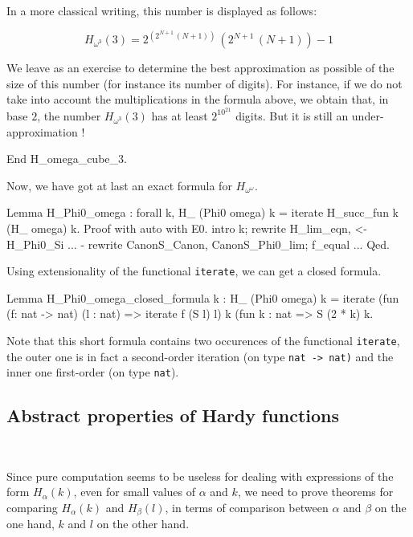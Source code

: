 In a more classical writing, this number is displayed as follows:

{\Large
$$
H_{\omega^3}(3) =  2 ^ {(2 ^ {N + 1} \, (N+1) )}   \,  (2 ^ {N+1} \, ( N +1) ) - 1
$$
}


We leave as an exercise to determine the best approximation as possible of
 the size of this number (for instance its number of digits).  For instance, if
we do not take into account the multiplications in the formula above,
we obtain that, in base $2$, the number $H_{\omega^3}(3)$ has at least
$2^{10^{21}}$  digits. But it is still an under-approximation !


\begin{Coqsrc}
End H_omega_cube_3.
\end{Coqsrc}




Now, we have got at last an exact formula for $H_{\omega^\omega}$.

\begin{Coqsrc}
Lemma H_Phi0_omega : forall k, H_ (Phi0 omega) k =
                               iterate H_succ_fun  k (H_ omega) k.
Proof with auto with E0.
  intro k; rewrite H_lim_eqn, <- H_Phi0_Si ...
  -  rewrite CanonS_Canon, CanonS_Phi0_lim;  f_equal ...
Qed.
\end{Coqsrc}

Using extensionality of the functional \texttt{iterate}, we can get a closed formula.

\begin{Coqsrc}
Lemma H_Phi0_omega_closed_formula k :
  H_ (Phi0 omega) k =
  iterate (fun (f: nat -> nat) (l : nat) => iterate  f (S l) l)
               k
               (fun k : nat => S (2 * k)%
               k.
\end{Coqsrc}




Note that this short formula contains two occurences of the functional \texttt{iterate}, the outer one is in fact a second-order iteration (on type \texttt{nat -> nat)}
and the inner one  first-order (on type \texttt{nat}). 


\subsection{Abstract properties of Hardy functions}
~\label{sect:H-alpha-prop} 

Since pure computation seems to be useless for dealing with expressions of the form $H_\alpha(k)$, even for small values of $\alpha$ and $k$, we need to prove theorems for comparing $H_\alpha(k)$ and $H_\beta(l)$, in terms of comparison
between $\alpha$ and $\beta$ on the one hand, $k$ and $l$ on the other hand.

